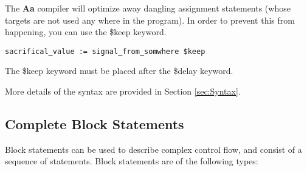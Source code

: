 \documentclass{article}
\begin{document}
The {\bf Aa} compiler will optimize away dangling
assignment statements (whose targets are not
used any where in the program). In order to prevent
this from happening, you can use the \$keep keyword.
\begin{verbatim}
sacrifical_value := signal_from_somwhere $keep
\end{verbatim}
The \$keep keyword must be placed after the \$delay
keyword.

More details of the syntax are provided in 
Section \ref{sec:Syntax}.


\subsection{Complete Block Statements}

Block statements can be used to describe complex
control flow,  and consist of a sequence of statements.
Block statements are of
the following types:
\end{document}
